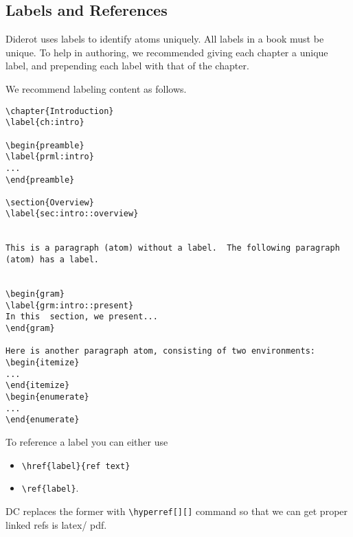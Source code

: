 \subsection{Labels and References}
\label{sec:dc::labels-refs}
Diderot uses labels to identify atoms uniquely. All labels
in a book must be unique.  To help in authoring, we recommended giving
each chapter a unique label, and prepending each label with that of
the chapter.


\begin{example}

We recommend labeling content as follows.

\begin{lstlisting}
\chapter{Introduction}
\label{ch:intro}

\begin{preamble}
\label{prml:intro}
...
\end{preamble}

\section{Overview}
\label{sec:intro::overview}


This is a paragraph (atom) without a label.  The following paragraph (atom) has a label.


\begin{gram}
\label{grm:intro::present}
In this  section, we present...
\end{gram}

Here is another paragraph atom, consisting of two environments:
\begin{itemize}
...
\end{itemize}
\begin{enumerate}
...
\end{enumerate}

\end{lstlisting}
\end{example}

\begin{gram}[References]
To reference a label you can either use
\begin{itemize}
\item \lstinline`\href{label}{ref text}`
\item \lstinline`\ref{label}`.
\end{itemize}
%
DC replaces the former with \lstinline`\hyperref[][]` command so that we can get proper linked refs is latex/ pdf.
\end{gram}


